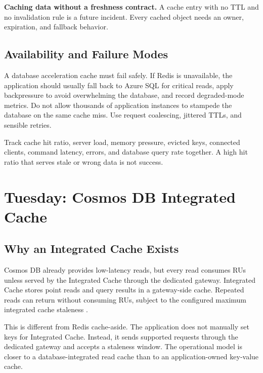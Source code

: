 \begin{pitfall}
\textbf{Caching data without a freshness contract.} A cache entry with no TTL and no invalidation rule is a future incident. Every cached object needs an owner, expiration, and fallback behavior.
\end{pitfall}

\subsection{Availability and Failure Modes}
A database acceleration cache must fail safely. If Redis is unavailable, the application should usually fall back to Azure SQL for critical reads, apply backpressure to avoid overwhelming the database, and record degraded-mode metrics. Do not allow thousands of application instances to stampede the database on the same cache miss. Use request coalescing, jittered TTLs, and sensible retries.

\begin{tipbox}
Track cache hit ratio, server load, memory pressure, evicted keys, connected clients, command latency, errors, and database query rate together. A high hit ratio that serves stale or wrong data is not success.
\end{tipbox}

\section{Tuesday: Cosmos DB Integrated Cache}

\subsection{Why an Integrated Cache Exists}
Cosmos DB already provides low-latency reads, but every read consumes RUs unless served by the Integrated Cache through the dedicated gateway. Integrated Cache stores point reads and query results in a gateway-side cache. Repeated reads can return without consuming RUs, subject to the configured maximum integrated cache staleness \cite{microsoft2025cosmosIntegratedCache}.

This is different from Redis cache-aside. The application does not manually set keys for Integrated Cache. Instead, it sends supported requests through the dedicated gateway and accepts a staleness window. The operational model is closer to a database-integrated read cache than to an application-owned key-value cache.

